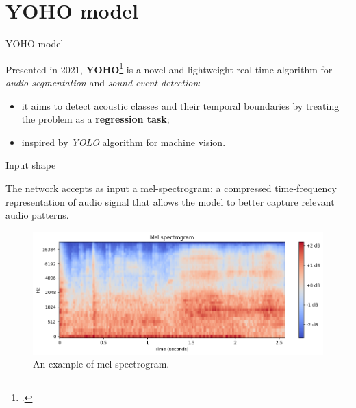 

\section[YOHO model]{YOHO model}

	\begin{frame}{YOHO model}
			
		Presented in 2021, \textbf{YOHO}\footcite{Venkatesh_2022} is a novel and lightweight real-time algorithm for \textit{audio segmentation} and \textit{sound event detection}:
		\begin{itemize}
			\item it aims to detect acoustic classes and their temporal boundaries by treating the problem as a \textbf{regression task};
			\item inspired by \textit{YOLO} algorithm for machine vision.
		\end{itemize}
		
		\note{
			\dots			
		}		
		
	\end{frame}
	
	\begin{frame}{Input shape}
	
		The network accepts as input a mel-spectrogram: a compressed time-frequency representation of audio signal that allows the model to better capture relevant audio patterns.
		
		\begin{figure}
			\centering
			\includegraphics[width=.75\textwidth]{images/spectrogram.png}

			\caption{An example of mel-spectrogram.}
			\label{fig:spectogram}
		\end{figure}
	
		
		\note{
			\dots
		}
	\end{frame}
	
